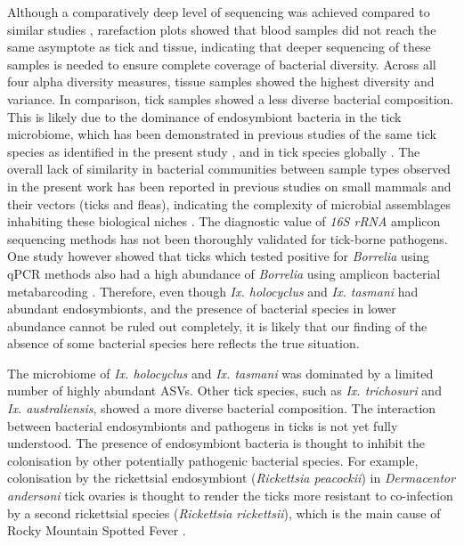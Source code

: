 \documentclass[a4paper, nobind]{templates/ociamthesis}
\begin{document}
Although a comparatively deep level of sequencing was achieved compared to similar studies \autocite{rynkiewiczConcordanceBacterialCommunities2015,geSpleenMicrobiotaSmall2018}, rarefaction plots showed that blood samples did not reach the same asymptote as tick and tissue, indicating that deeper sequencing of these samples is needed to ensure complete coverage of bacterial diversity.
Across all four alpha diversity measures, tissue samples showed the highest diversity and variance.
In comparison, tick samples showed a less diverse bacterial composition.
This is likely due to the dominance of endosymbiont bacteria in the tick microbiome, which has been demonstrated in previous studies of the same tick species as identified in the present study \autocite{goftonInhibitionEndosymbiontCandidatus2015,eganBacterialCommunityProfiling2020}, and in tick species globally \autocite{lalzarCompositionSeasonalVariation2012,gilIxodesScapularisMicrobiome2020}.
The overall lack of similarity in bacterial communities between sample types observed in the present work has been reported in previous studies on small mammals and their vectors (ticks and fleas), indicating the complexity of microbial assemblages inhabiting these biological niches \autocite{cohenSimilaritiesSeasonalVariations2015,rynkiewiczConcordanceBacterialCommunities2015,liStochasticProcessesGovern2018}.
The diagnostic value of \emph{16S rRNA} amplicon sequencing methods has not been thoroughly validated for tick-borne pathogens.
One study however showed that ticks which tested positive for \emph{Borrelia} using qPCR methods also had a high abundance of \emph{Borrelia} using amplicon bacterial metabarcoding \autocite{sperlingMicrobiomeCompositionBorrelia2020}.
Therefore, even though \emph{Ix. holocyclus} and \emph{Ix. tasmani} had abundant endosymbionts, and the presence of bacterial species in lower abundance cannot be ruled out completely, it is likely that our finding of the absence of some bacterial species here reflects the true situation.

The microbiome of \emph{Ix. holocyclus} and \emph{Ix. tasmani} was dominated by a limited number of highly abundant ASVs.
Other tick species, such as \emph{Ix. trichosuri} and \emph{Ix. australiensis}, showed a more diverse bacterial composition.
The interaction between bacterial endosymbionts and pathogens in ticks is not yet fully understood.
The presence of endosymbiont bacteria is thought to inhibit the colonisation by other potentially pathogenic bacterial species.
For example, colonisation by the rickettsial endosymbiont (\emph{Rickettsia peacockii}) in \emph{Dermacentor andersoni} tick ovaries is thought to render the ticks more resistant to co-infection by a second rickettsial species (\emph{Rickettsia rickettsii}), which is the main cause of Rocky Mountain Spotted Fever
\autocite{burgdorferNonpathogenicRickettsiaeDermacentor1981}
\autocite{burgdorferNonpathogenicRickettsiaeDermacentor1981,macalusoRickettsialInfectionDermacentor2002}.
\end{document}
